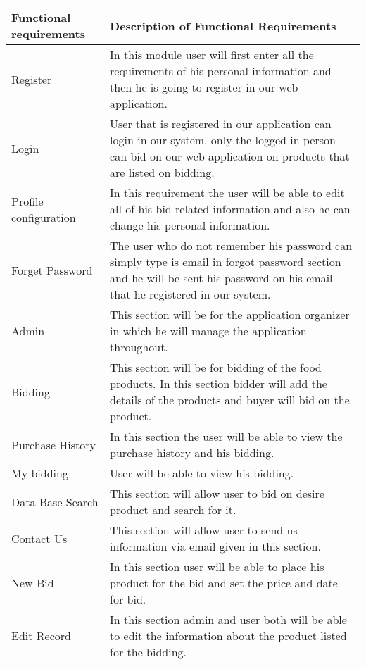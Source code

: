 \begin{table}[!h]
    \centering
    \begin{tabular}{|p{3cm}|p{11cm}|}
        \hline 
        Functional requirements & Description of Functional Requirements \\
        \hline
        Register & In this module user will first enter all the requirements of his personal information and then he is going to register in our web application.  \\ 
        \hline
        Login & User that is registered in our application can login in our system. only the logged in  person can bid on our web application on products that are listed on bidding.\\
        \hline
        Profile configuration & In this requirement the user will be able to edit all of his bid related information and also he can change his personal information.\\ 
        \hline
        Forget Password & The user who do not remember his password can simply type is email in forgot password section and he will be sent his password on his email that he registered in our system. \\
        \hline
        Admin & This section will be for the application organizer in which he will manage the application throughout.\\
        \hline
        Bidding & This section will be for bidding of the food products. In this section bidder will add the details of the products and buyer will bid on the product.\\ 
        \hline
        Purchase History & In this section the user will be able to view the purchase history and his bidding.\\
        \hline
        My bidding & User will be able to view his bidding.\\ 
        \hline
        Data Base Search & This section will allow user to bid on desire product and search for it.\\
        \hline
        Contact Us & This section will allow user to send us information via email given in this section.\\
        \hline
        New Bid & In this section user will be able to place his product for the bid and set the price and date for bid. \\
        \hline
        Edit Record & In this section admin and user both will be able to edit the information about the product listed for the bidding.\\

\end{tabular}
\end{table}
